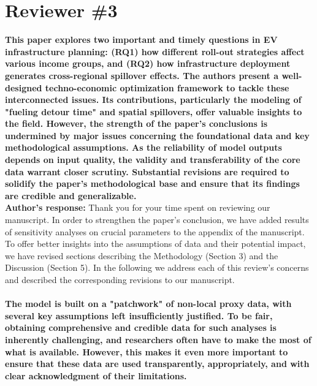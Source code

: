 \documentclass[11pt]{article}
\begin{document}
\section*{Reviewer \#3}
\textbf{This paper explores two important and timely questions in EV infrastructure planning: (RQ1) how different roll-out strategies affect various income groups, and (RQ2) how infrastructure deployment generates cross-regional spillover effects. The authors present a well-designed techno-economic optimization framework to tackle these interconnected issues. Its contributions, particularly the modeling of "fueling detour time" and spatial spillovers, offer valuable insights to the field. However, the strength of the paper's conclusions is undermined by major issues concerning the foundational data and key methodological assumptions. As the reliability of model outputs depends on input quality, the validity and transferability of the core data warrant closer scrutiny. Substantial revisions are required to solidify the paper's methodological base and ensure that its findings are credible and generalizable.}
\\ 
\color{authorblue}\noindent \textcolor{authorblue}{\textbf{Author's response:}} Thank you for your time spent on reviewing our manuscript. In order to strengthen the paper's conclusion, we have added results of sensitivity analyses on crucial parameters to the appendix of the manuscript. To offer better insights into the assumptions of data and their potential impact, we have revised sections describing the Methodology (Section 3) and the Discussion (Section 5). In the following we address each of this review's concerns and described the corresponding revisions to our manuscript.
\\
\\
\color{reviewergrey}
\textbf{The model is built on a "patchwork" of non-local proxy data, with several key assumptions left insufficiently justified. To be fair, obtaining comprehensive and credible data for such analyses is inherently challenging, and researchers often have to make the most of what is available. However, this makes it even more important to ensure that these data are used transparently, appropriately, and with clear acknowledgment of their limitations.} \\ 
\color{reviewergrey}
\end{document}
